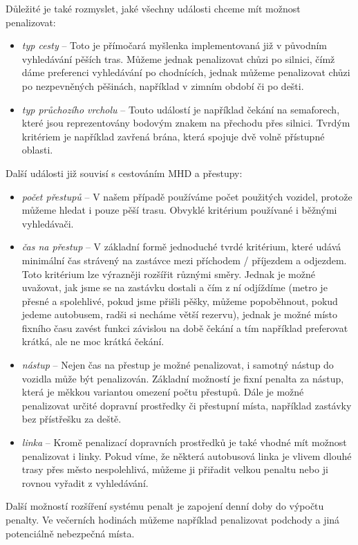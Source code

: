 Důležité je také rozmyslet, jaké všechny události chceme mít možnost
penalizovat:
\begin{itemize}
	\item {\em typ cesty} -- Toto je přímočará myšlenka implementovaná již v
	původním vyhledávání pěších tras. Můžeme jednak penalizovat chůzi po
	silnici, čímž dáme preferenci vyhledávání po chodnících, jednak můžeme
	penalizovat chůzi po nezpevněných pěšinách, například v zimním období či
	po dešti.
	\item {\em typ průchozího vrcholu} -- Touto událostí je například čekání
	na semaforech, které jsou reprezentovány bodovým znakem na přechodu přes
	silnici. Tvrdým kritériem je například zavřená brána, která spojuje dvě
	volně přístupné oblasti.
\end{itemize}
Další události již souvisí s cestováním MHD a přestupy:
\begin{itemize}
	\item {\em počet přestupů} -- V našem případě používáme počet použitých
	vozidel, protože můžeme hledat i pouze pěší trasu. Obvyklé kritérium
	používané i běžnými vyhledávači.
	\item {\em čas na přestup} -- V základní formě jednoduché
	tvrdé kritérium, které udává minimální čas strávený na zastávce mezi
	příchodem / příjezdem a odjezdem. Toto kritérium lze výrazněji rozšířit
	různými směry. Jednak je možné uvažovat, jak jsme se na zastávku dostali
	a čím z ní odjíždíme (metro je přesné a spolehlivé, pokud jsme přišli
	pěšky, můžeme popoběhnout, pokud jedeme autobusem, radši si necháme
	větší rezervu), jednak je možné místo fixního času zavést funkci
	závislou na době čekání a tím například preferovat krátká, ale ne moc
	krátká čekání. 
	\item {\em nástup} -- Nejen čas na přestup je možné penalizovat, i
	samotný nástup do vozidla může být penalizován. Základní možností je
	fixní penalta za nástup, která je měkkou variantou omezení počtu
	přestupů. Dále je možné penalizovat určité dopravní prostředky či přestupní
	místa, například zastávky bez přístřešku za deště. 
	\item {\em linka} -- Kromě penalizací dopravních prostředků je také
	vhodné mít možnost penalizovat i linky. Pokud víme, že některá
	autobusová linka je vlivem dlouhé trasy přes město nespolehlivá, můžeme
	ji přiřadit velkou penaltu nebo ji rovnou vyřadit z vyhledávání. 
\end{itemize}

Další možností rozšíření systému penalt je zapojení denní doby do výpočtu
penalty. Ve večerních hodinách můžeme například penalizovat podchody a jiná
potenciálně nebezpečná místa.

